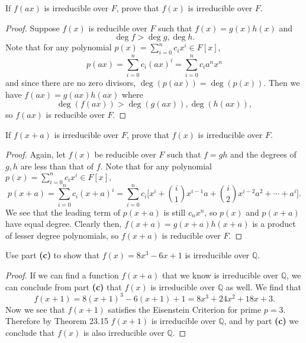\documentclass{article}
\newenvironment{problem2}[1]{\noindent {\bf (#1}}
{\medskip}
\begin{document}
\begin{problem2}{b)} If $f(ax)$ is irreducible over $F$, prove that $f(x)$ is irreducible over $F$.
\begin{proof} Suppose $f(x)$ is reducible over $F$ such that $f(x)=g(x)h(x)$ and $$\deg f> \deg g, \deg h. $$ Note that for any polynomial $p(x)=\sum_{i=0}^nc_ix^i\in F[x]$, $$p(ax)=\sum_{i=0}^nc_i(ax)^i=\sum_{i=0}^nc_ia^nx^n$$ and since there are no zero divisors, $\deg( p(ax))=\deg (p(x))$. Then we have $f(ax)=g(ax)h(ax)$ where $$\deg( f(ax)) > \deg (g(ax)), \deg( h(ax)),$$ so $f(ax)$ is reducible over $F$.
\end{proof}
\end{problem2}

\begin{problem2}{c)} If $f(x+a)$ is irreducible over $F$, prove that $f(x)$ is irreducible over $F$.
\begin{proof} Again, let $f(x)$ be reducible over $F$ such that $f=gh$ and the degrees of $g,h$ are less than that of $f$. Note that for any polynomial $p(x)=\sum_{i=0}^nc_ix^i\in F[x],$ $$p(x+a)=\sum_{i=0}^nc_i(x+a)^i=\sum_{i=0}^nc_i\Bigg[x^i + {i\choose1}x^{i-1}a+{i\choose2}x^{i-2}a^2+\cdots+a^i\Bigg].$$ We see that the leading term of $p(x+a)$ is still $c_nx^n$, so $p(x)$ and $p(x+a)$ have equal degree. Clearly then, $f(x+a)=g(x+a)h(x+a)$ is a product of lesser degree polynomials, so $f(x+a)$ is reducible over $F$.
\end{proof}
\end{problem2}

\begin{problem2}{d)} Use part \textbf{(c)} to show that $f(x)=8x^3-6x+1$ is irreducible over $\mathbb{Q}.$
\begin{proof} If we can find a function $f(x+a)$ that we know is irreducible over $\mathbb{Q}$, we can conclude from part \textbf{(c)} that $f(x)$ is irreducible over $\mathbb{Q}$ as well. We find that $$f(x+1)=8(x+1)^3-6(x+1)+1=8x^3+24x^2+18x+3.$$ Now we see that $f(x+1)$ satisfies the Eisenstein Criterion for prime $p=3$. Therefore by Theorem 23.15 $f(x+1)$ is irreducible over  $\mathbb{Q}$, and by part \textbf{(c)} we conclude that $f(x)$ is also irreducible over $\mathbb{Q}$.
\end{proof}
\end{problem2}
\end{document}
